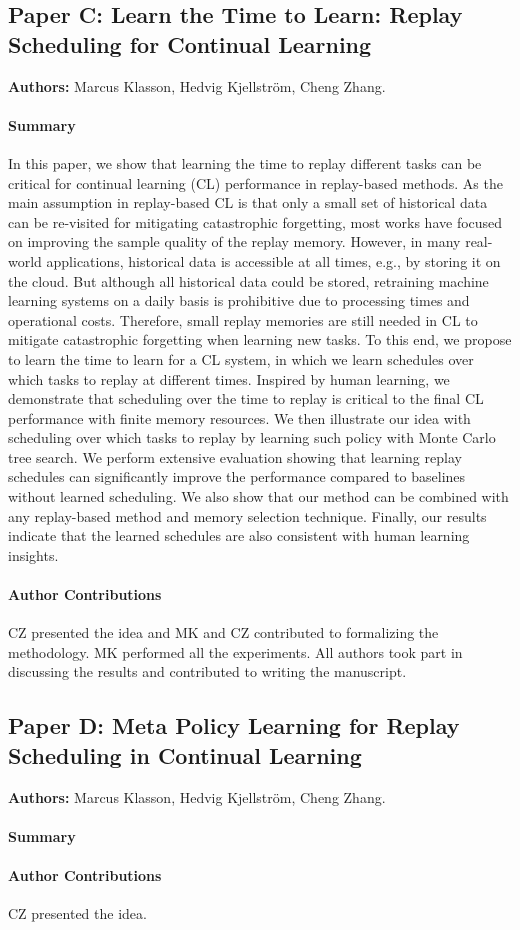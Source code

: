 \subsection{Paper C: Learn the Time to Learn: Replay Scheduling for Continual Learning}
\label{sec:paperC}

\textbf{Authors:} Marcus Klasson, Hedvig Kjellström, Cheng Zhang. 

\paragraph{Summary}
In this paper, we show that learning the time to replay different tasks can be critical for continual learning (CL) performance in replay-based methods. As the main assumption in replay-based CL is that only a small set of historical data can be re-visited for mitigating catastrophic forgetting, most works have focused on improving the sample quality of the replay memory. However, in many real-world applications, historical data is accessible at all times, e.g., by storing it on the cloud. But although all historical data could be stored, retraining machine learning systems on a daily basis is prohibitive due to processing times and operational costs. Therefore, small replay memories are still needed in CL to mitigate catastrophic forgetting when learning new tasks. To this end, we propose to learn the time to learn for a CL system, in which we learn schedules over which tasks to replay at different times. Inspired by human learning, we demonstrate that scheduling over the time to replay is critical to the final CL performance with finite memory resources. We then illustrate our idea with scheduling over which tasks to replay by learning such policy with Monte Carlo tree search. We perform extensive evaluation showing that learning replay schedules can significantly improve the performance compared to baselines without learned scheduling. We also show that our method can be combined with any replay-based method and memory selection technique. Finally, our results indicate that the learned schedules are also consistent with human learning insights.



\paragraph{Author Contributions} 
CZ presented the idea and MK and CZ contributed to formalizing the methodology. 
MK performed all the experiments. 
All authors took part in discussing the results and contributed to writing the manuscript. 


\subsection{Paper D: Meta Policy Learning for Replay Scheduling in Continual Learning}
\label{sec:paperD}

\textbf{Authors:} Marcus Klasson, Hedvig Kjellström, Cheng Zhang. 

\paragraph{Summary} 



\paragraph{Author Contributions} CZ presented the idea. 
